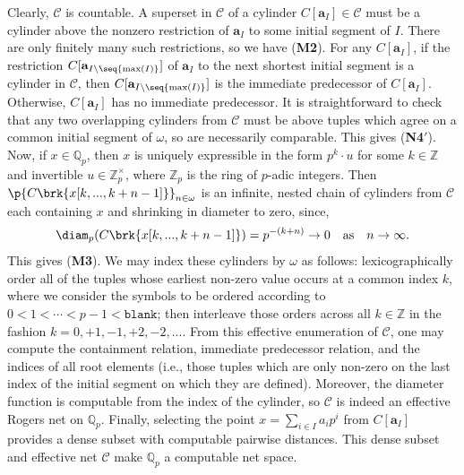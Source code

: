 \begin{example}
    Clearly, $\mathcal{C}$ is countable. A superset in $\mathcal{C}$ of a cylinder $C[\mathbf{a}_I] \in \mathcal{C}$ must be a cylinder above the nonzero restriction of $\mathbf{a}_I$ to some initial segment of $I$. There are only finitely many such restrictions, so we have (\textbf{M2}). For any $C[\mathbf{a}_I]$, if the restriction $C[\mathbf{a}_{I \setminus \seq{\max(I)}}]$ of $\mathbf{a}_I$ to the next shortest initial segment is a cylinder in $\mathcal{C}$, then $C[\mathbf{a}_{I \setminus \seq{\max(I)}}]$ is the immediate predecessor of $C[\mathbf{a}_I]$. Otherwise, $C[\mathbf{a}_I]$ has no immediate predecessor. It is straightforward to check that any two overlapping cylinders from $\mathcal{C}$ must be above tuples which agree on a common initial segment of $\omega$, so are necessarily comparable. This gives (\textbf{N4}$'$). Now, if $x \in \mathbb{Q}_p$, then $x$ is uniquely expressible in the form $p^{k} \cdot u$ for some $k \in \mathbb{Z}$ and invertible $u \in \mathbb{Z}^\times_p$, where $\mathbb{Z}_p$ is the ring of $p$-adic integers. Then $\p{C\brk{x [k, ..., k + n - 1]}}_{n \in \omega}$ is an infinite, nested chain of cylinders from $\mathcal{C}$ each containing $x$ and shrinking in diameter to zero, since,
    \begin{align*}
        \diam_p(C\brk{x[k, ..., k + n - 1]}) = p^{- (k + n)} \to 0 \quad \text{as} \quad n \to \infty.
    \end{align*}
    This gives (\textbf{M3}). We may index these cylinders by $\omega$ as follows: lexicographically order all of the tuples whose earliest non-zero value occurs at a common index $k$, where we consider the symbols to be ordered according to $0 < 1 < \cdots < p - 1 < \texttt{blank}$; then interleave those orders across all $k \in \mathbb{Z}$ in the fashion $k = 0, +1, -1, +2, -2, ...$. From this effective enumeration of $\mathcal{C}$, one may compute the containment relation, immediate predecessor relation, and the indices of all root elements (i.e., those tuples which are only non-zero on the last index of the initial segment on which they are defined). Moreover, the diameter function is computable from the index of the cylinder, so $\mathcal{C}$ is indeed an effective Rogers net on $\mathbb{Q}_p$. Finally, selecting the point $x = \sum_{i \in I} a_i p^i$ from $C[\mathbf{a}_I]$ provides a dense subset with computable pairwise distances. This dense subset and effective net $\mathcal{C}$ make $\mathbb{Q}_p$ a computable net space.
\end{example} 

